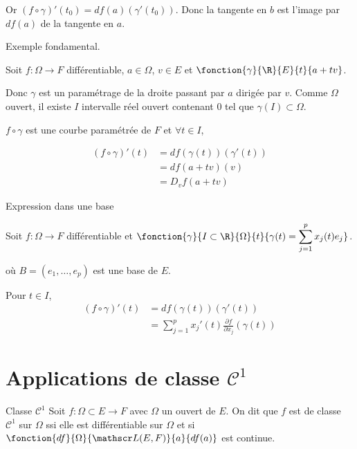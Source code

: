 Or $(f \circ \gamma)'(t_0) = df(a)(\gamma'(t_0))$. Donc la tangente en $b$ est l'image par 
$df(a)$ de la tangente en $a$. 

\begin{exemple}
    Exemple fondamental. 

    Soit $f : \Omega \to F$ différentiable, $a \in \Omega$, $v \in E$ et 
    $\fonction{\gamma}{\R}{E}{t}{a + t v}$.

    Donc $\gamma$ est un paramétrage de la droite passant par $a$ dirigée par $v$. Comme 
    $\Omega$ ouvert, il existe $I$ intervalle réel ouvert contenant $0$ tel que 
    $\gamma(I) \subset \Omega$. 

    $f \circ \gamma$ est une courbe paramétrée de $F$ et $\forall t \in I$, 
    

    \begin{align}
        (f \circ \gamma)'(t) & = df(\gamma(t))(\gamma'(t)) \\
        & = df(a + t v)(v) \\
        & = D_v f(a + t v)
    \end{align}
\end{exemple}

\begin{exemple}
    Expression dans une base 

    Soit $f : \Omega \to F$ différentiable et 
    $\fonction{\gamma}{I \subset \R}{\Omega}{t}{\gamma(t) = \displaystyle \sum_{j = 1}^{p } x_j(t) e_j}$.

    où $B = (e_1, \ldots, e_p)$ est une base de $E$. 

    Pour $t \in I$, 
    \begin{align}
        (f \circ \gamma)'(t) & = df(\gamma(t))(\gamma'(t)) \\
        & = \sum_{j = 1 }^{p } x_j'(t) \frac{\partial f }{\partial x_j }(\gamma(t))
    \end{align}
\end{exemple}

\section{Applications de classe \texorpdfstring{$\mathscr C^1$}{C1}}

\begin{definition}{Classe $\mathscr{C}^1$}{}
    Soit $f : \Omega \subset E \to F$ avec $\Omega$ un ouvert de $E$. 
    On dit que $f$ est de classe $\mathscr C^1$ sur $\Omega$ ssi elle est 
    différentiable sur $\Omega$ et si $\fonction{df}{\Omega}{\mathscr L(E, F)}{a}{df(a)}$
    est continue. 
\end{definition}

